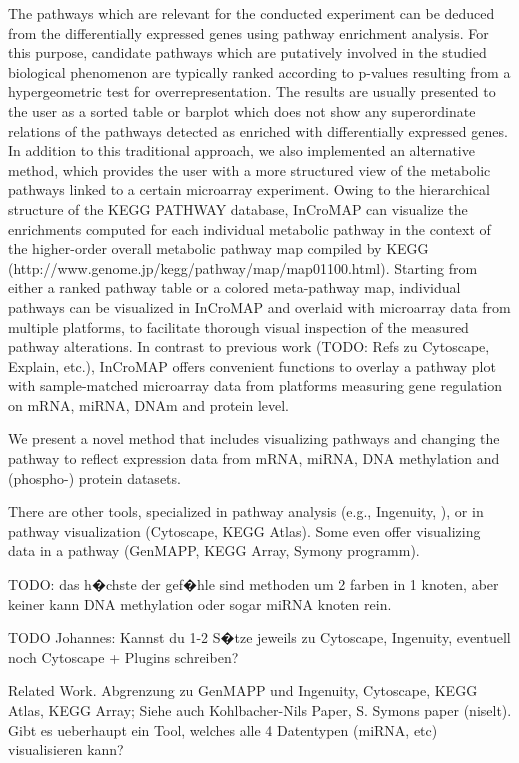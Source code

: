 \documentclass{bioinfo}
\begin{document}
The pathways which are relevant for the conducted experiment can be deduced from the differentially expressed genes using pathway enrichment analysis. For this purpose, candidate pathways which are putatively involved in the studied biological phenomenon are typically ranked according to p-values resulting from a hypergeometric test for overrepresentation. The results are usually presented to the user as a sorted table or barplot which does not show any superordinate relations of the pathways detected as enriched with differentially expressed genes. In addition to this traditional approach, we also implemented an alternative method, which provides the user with a more structured view of the metabolic pathways linked to a certain microarray experiment. Owing to the hierarchical structure of the KEGG PATHWAY database, InCroMAP can visualize the enrichments computed for each individual metabolic pathway in the context of the higher-order overall metabolic pathway map compiled by KEGG (http://www.genome.jp/kegg/pathway/map/map01100.html). Starting from either a ranked pathway table or a colored meta-pathway map, individual pathways can be visualized in InCroMAP and overlaid with microarray data from multiple platforms, to facilitate thorough visual inspection of the measured pathway alterations. In contrast to previous work (TODO: Refs zu Cytoscape, Explain, etc.), InCroMAP offers convenient functions to overlay a pathway plot with sample-matched microarray data from platforms measuring gene regulation on mRNA, miRNA, DNAm and protein level.



We present a novel method that includes visualizing pathways and changing the pathway to reflect expression data from mRNA, miRNA, DNA methylation and (phospho-) protein datasets.



There are other tools, specialized in pathway analysis (e.g., Ingenuity, ), or in pathway visualization (Cytoscape, KEGG Atlas). Some even offer visualizing data in a pathway (GenMAPP, KEGG Array, Symony programm).

TODO: das h�chste der gef�hle sind methoden um 2 farben in 1 knoten, aber keiner kann DNA methylation oder sogar miRNA knoten rein.

TODO Johannes: Kannst du 1-2 S�tze jeweils zu Cytoscape, Ingenuity, eventuell noch Cytoscape + Plugins schreiben?


Related Work. Abgrenzung zu GenMAPP und Ingenuity, Cytoscape, KEGG Atlas, KEGG Array; Siehe auch Kohlbacher-Nils Paper, S. Symons paper (niselt).
Gibt es ueberhaupt ein Tool, welches alle 4 Datentypen (miRNA, etc) visualisieren kann?
\end{document}
